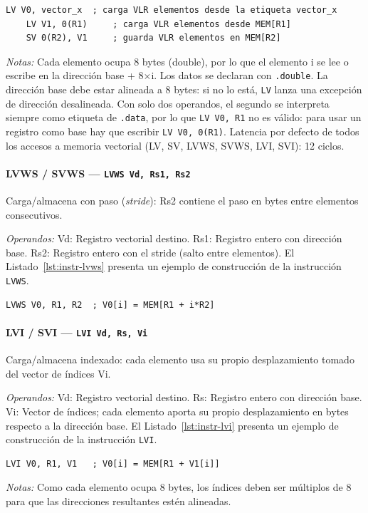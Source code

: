 \documentclass[../main.tex]{subfiles}
\begin{document}
\begin{lstlisting}[caption={LV y SV},label={lst:instr-lv}]
	LV V0, vector_x  ; carga VLR elementos desde la etiqueta vector_x
	LV V1, 0(R1)     ; carga VLR elementos desde MEM[R1]
	SV 0(R2), V1     ; guarda VLR elementos en MEM[R2]
\end{lstlisting}
\textit{Notas:} Cada elemento ocupa 8 bytes (double), por lo que el elemento i se lee o escribe en la dirección base + 8$\times$i. Los datos se declaran con \texttt{.double}. La dirección base debe estar alineada a 8 bytes: si no lo está, \texttt{LV} lanza una excepción de dirección desalineada. Con solo dos operandos, el segundo se interpreta siempre como etiqueta de \texttt{.data}, por lo que \texttt{LV V0, R1} no es válido: para usar un registro como base hay que escribir \texttt{LV V0, 0(R1)}. Latencia por defecto de todos los accesos a memoria vectorial (LV, SV, LVWS, SVWS, LVI, SVI): 12 ciclos.

\paragraph*{LVWS / SVWS --- \texttt{LVWS Vd, Rs1, Rs2}}
Carga/almacena con paso (\textit{stride}): Rs2 contiene el paso en bytes entre elementos consecutivos.

\textit{Operandos:} Vd: Registro vectorial destino. Rs1: Registro entero con dirección base. Rs2: Registro entero con el stride (salto entre elementos).
El Listado~\ref{lst:instr-lvws} presenta un ejemplo de construcción de la instrucción \texttt{LVWS}.

\begin{lstlisting}[caption={LVWS},label={lst:instr-lvws}]
	LVWS V0, R1, R2  ; V0[i] = MEM[R1 + i*R2]
\end{lstlisting}

\paragraph*{LVI / SVI --- \texttt{LVI Vd, Rs, Vi}}
Carga/almacena indexado: cada elemento usa su propio desplazamiento tomado del vector de índices Vi.

\textit{Operandos:} Vd: Registro vectorial destino. Rs: Registro entero con dirección base. Vi: Vector de índices; cada elemento aporta su propio desplazamiento en bytes respecto a la dirección base.
El Listado~\ref{lst:instr-lvi} presenta un ejemplo de construcción de la instrucción \texttt{LVI}.

\begin{lstlisting}[caption={LVI},label={lst:instr-lvi}]
	LVI V0, R1, V1   ; V0[i] = MEM[R1 + V1[i]]
\end{lstlisting}
\textit{Notas:} Como cada elemento ocupa 8 bytes, los índices deben ser múltiplos de 8 para que las direcciones resultantes estén alineadas.
\end{document}
